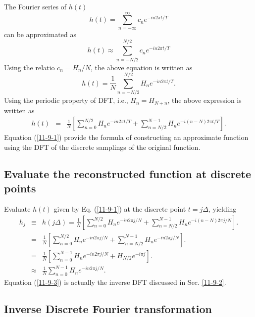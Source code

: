 \documentclass{article}
\begin{document}
The Fourier series of $h (t)$
\begin{equation}
  h (t) = \sum_{n = - \infty}^{\infty} c_n e^{- i n 2 \pi t / T}
\end{equation}
can be approximated as
\begin{equation}
  h (t) \approx \sum_{n = - N / 2}^{N / 2} c_n e^{- i n 2 \pi t / T}
\end{equation}
Using the relatio $c_n = H_n / N$, the above equation is written as
\begin{equation}
  h (t) = \frac{1}{N} \sum_{n = - N / 2}^{N / 2} H_n e^{- i n 2 \pi t / T} .
\end{equation}
Using the periodic property of DFT, i.e., $H_n = H_{N + n}$, the above
expression is written as
\begin{eqnarray}
  h (t) & = & \frac{1}{N} \left[ \sum_{n = 0}^{N / 2} H_n e^{- i n 2 \pi t /
  T} + \sum_{n = N / 2}^{N - 1} H_n e^{- i (n - N) 2 \pi t / T} \right] . 
  \label{11-9-1}
\end{eqnarray}
Equation (\ref{11-9-1}) provide the formula of constructing an approximate
function using the DFT of the discrete samplings of the original function.

\subsection{Evaluate the reconstructed function at discrete points}

Evaluate $h (t)$ given by Eq. (\ref{11-9-1}) at the discrete point $t = j
\Delta$, yielding
\begin{eqnarray}
  h_j & \equiv & h (j \Delta) = \frac{1}{N} \left[ \sum_{n = 0}^{N / 2} H_n
  e^{- i n 2 \pi j / N} + \sum_{n = N / 2}^{N - 1} H_n e^{- i (n - N) 2 \pi j
  / N} \right] . \nonumber\\
  & = & \frac{1}{N} \left[ \sum_{n = 0}^{N / 2} H_n e^{- i n 2 \pi j / N} +
  \sum_{n = N / 2}^{N - 1} H_n e^{- i n 2 \pi j / N} \right] . \nonumber\\
  & = & \frac{1}{N} \left[ \sum_{n = 0}^{N - 1} H_n e^{- i n 2 \pi j / N} +
  H_{N / 2} e^{- i \pi j} \right] . \nonumber\\
  & \approx & \frac{1}{N} \sum_{n = 0}^{N - 1} H_n e^{- i n 2 \pi j / N} . 
  \label{11-9-3}
\end{eqnarray}
Equation (\ref{11-9-3}) is actually the inverse DFT discussed in Sec.
\ref{11-9-2}.

\subsection{\label{11-9-2}Inverse Discrete Fourier transformation}
\end{document}
